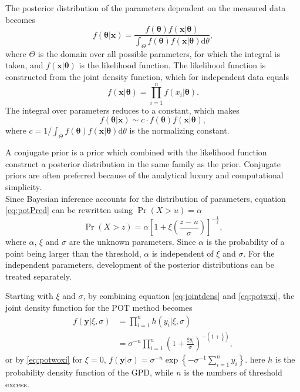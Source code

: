 The posterior distribution of the parameters dependent on the measured data becomes 
\begin{equation}
f(\boldsymbol{\theta}|\boldsymbol{x})=\frac{f(\boldsymbol{\theta})f(\boldsymbol{x}|\boldsymbol{\theta})}{\int_{\Theta} f(\boldsymbol{\theta})f(\boldsymbol{x}|\boldsymbol{\theta}) \mathrm{d} \theta}, 
\end{equation}
where $\Theta$ is the domain over all possible parameters, for which the integral is taken, and  $f(\boldsymbol{x}|\boldsymbol{\theta})$ is the likelihood function. The likelihood function is constructed from the joint density function, which for independent data equals
\begin{equation}
\label{eq:jointdens}
f(\boldsymbol{x}|\boldsymbol{\theta})=\prod_{i=1}^{n} f(x_i|\boldsymbol{\theta}).
\end{equation}
The integral over parameters reduces to a constant, which makes
\begin{equation}
f(\boldsymbol{\theta}|\boldsymbol{x}) \sim c \cdot f(\boldsymbol{\theta})f(\boldsymbol{x}|\boldsymbol{\theta}), \label{eq:genposteriorc}
\end{equation}
where $c=1/ \int_{\Theta} f(\boldsymbol{\theta})f(\boldsymbol{x}|\boldsymbol{\theta}) \mathrm{d} \theta$ is the normalizing constant.

A conjugate prior is a prior which combined with the likelihood function construct a posterior distribution in the same family as the prior.  Conjugate priors are often preferred because of the analytical luxury and computational simplicity.\\

Since Bayesian inference accounts for the distribution of parameters, equation \eqref{eq:potPred} can be rewritten using $\Pr(X>u)=\alpha$
\begin{equation}
\Pr(X>z)=\alpha \left[1+\xi \left( \frac{z-u}{\sigma}\right)\right]^{-\frac{1}{\xi}},
\end{equation}
where $\alpha$, $\xi$ and $\sigma$ are the unknown parameters. Since $\alpha$ is the probability of a point being larger than the threshold, $\alpha$ is independent of $\xi$ and $\sigma$. For the independent parameters, development of the posterior distributions can be treated separately. 

Starting with $\xi$ and $\sigma$, by combining equation \eqref{eq:jointdens} and \eqref{eq:potwxi}, the joint density function for the POT method becomes
\begin{align}
f(\boldsymbol{y}|\xi,\sigma)&=\prod_{i=1}^{n} h(y_i|\xi,\sigma)\nonumber\\
&=\sigma^{-n} \prod_{i=1}^{n}\left( 1+\frac{\xi y_i}{\sigma}\right)^{-\left(1+\frac{1}{\xi}\right)}, \label{eq:jointdenspot}
\end{align}
or by \eqref{eq:potwoxi} for $\xi=0$, $f(\boldsymbol{y}|\sigma)=\sigma^{-n}\exp\left\{-\sigma^{-1} \sum_{i=1}^{n}y_i \right\}$.  here $h$ is the probability density function of the GPD, while $n$ is the numbers of threshold excess.

